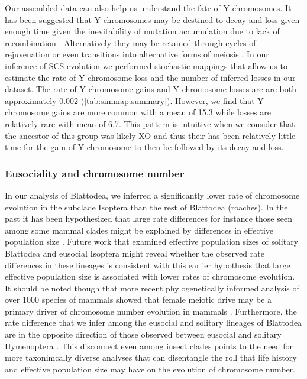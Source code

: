Our assembled data can also help us understand the fate of Y chromosomes. 
It has been suggested that Y chromosomes may be destined to decay and loss given enough time given the inevitability of mutation accumulation due to lack of recombination \citep{steinemann2005}.
Alternatively they may be retained through cycles of rejuvenation or even transitions into alternative forms of meiosis \citep{blackmon2015bioessay}.
In our inference of SCS evolution we performed stochastic mappings that allow us to estimate the rate of Y chromosome loss and the number of inferred losses in our dataset.
The rate of Y chromosome gains and Y chromosome losses are are both approximately 0.002 (\cref{tab:simmap.summary}). 
However, we find that Y chromosome gains are more common with a mean of 15.3 while losses are relatively rare with mean of 6.7.
This pattern is intuitive when we consider that the ancestor of this group was likely XO and thus their has been relatively little time for the gain of Y chromosome to then be followed by its decay and loss.

\subsubsection{Eusociality and chromosome number}
In our analysis of Blattodea, we inferred a significantly lower rate of chromosome evolution in the subclade Isoptera than the rest of Blattodea (roaches).
In the past it has been hypothesized that large rate differences for instance those seen among some mammal clades might be explained by differences in effective population size \citep{bush1977rapid}.
Future work that examined effective population sizes of solitary Blattodea and eusocial Isoptera might reveal whether the observed rate differences in these lineages is consistent with this earlier hypothesis that large effective population size is associated with lower rates of chromosome evolution.
It should be noted though that more recent phylogenetically informed analysis of over 1000 species of mammals showed that female meiotic drive may be a primary driver of chromosome number evolution in mammals \citep{blackmon2019meiotic}.
Furthermore, the rate difference that we infer among the eusocial and solitary lineages of Blattodea are in the opposite direction of those observed between eusocial and solitary Hymenoptera \citep{ross2015}.
This disconnect even among insect clades points to the need for more taxonimcally diverse analyses that can disentangle the roll that life history and effective population size may have on the evolution of chromosome number.

